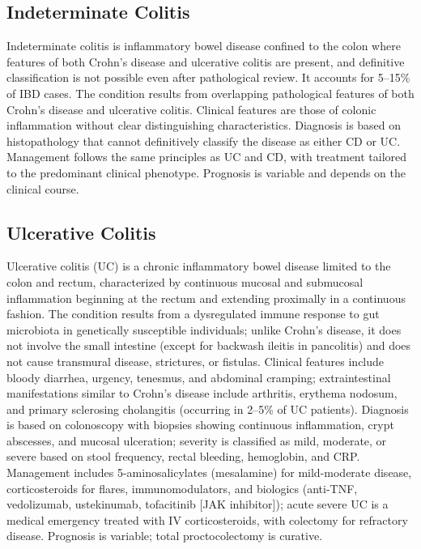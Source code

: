 \subsection{Indeterminate Colitis}
\label{sec:Indeterminate Colitis}
Indeterminate colitis is inflammatory bowel disease confined to the colon where features of both Crohn's disease and ulcerative colitis are present, and definitive classification is not possible even after pathological review. It accounts for 5--15\% of IBD cases. The condition results from overlapping pathological features of both Crohn's disease and ulcerative colitis. Clinical features are those of colonic inflammation without clear distinguishing characteristics. Diagnosis is based on histopathology that cannot definitively classify the disease as either CD or UC. Management follows the same principles as UC and CD, with treatment tailored to the predominant clinical phenotype. Prognosis is variable and depends on the clinical course.

\subsection{Ulcerative Colitis}
\label{sec:Ulcerative Colitis}
Ulcerative colitis (UC) is a chronic inflammatory bowel disease limited to the colon and rectum, characterized by continuous mucosal and submucosal inflammation beginning at the rectum and extending proximally in a continuous fashion. The condition results from a dysregulated immune response to gut microbiota in genetically susceptible individuals; unlike Crohn's disease, it does not involve the small intestine (except for backwash ileitis in pancolitis) and does not cause transmural disease, strictures, or fistulas. Clinical features include bloody diarrhea, urgency, tenesmus, and abdominal cramping; extraintestinal manifestations similar to Crohn's disease include arthritis, erythema nodosum, and primary sclerosing cholangitis (occurring in 2--5\% of UC patients). Diagnosis is based on colonoscopy with biopsies showing continuous inflammation, crypt abscesses, and mucosal ulceration; severity is classified as mild, moderate, or severe based on stool frequency, rectal bleeding, hemoglobin, and CRP. Management includes 5-aminosalicylates (mesalamine) for mild-moderate disease, corticosteroids for flares, immunomodulators, and biologics (anti-TNF, vedolizumab, ustekinumab, tofacitinib [JAK inhibitor]); acute severe UC is a medical emergency treated with IV corticosteroids, with colectomy for refractory disease. Prognosis is variable; total proctocolectomy is curative.

